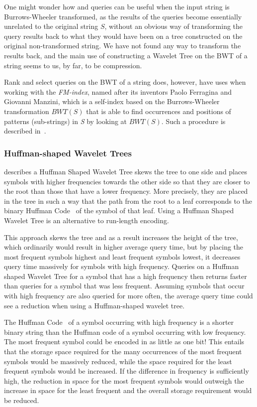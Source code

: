 One might wonder how  and  queries can be useful when the input string is Burrows-Wheeler transformed, as the results of the queries become essentially unrelated to the original string $S$, without an obvious way of transforming the query results back to what they would have been on a tree constructed on the original non-transformed string.
We have not found any way to transform the results back, and the main use of constructing a Wavelet Tree on the BWT of a string seems to us, by far, to be compression.

Rank and select queries on the BWT of a string does, however, have uses when working with the \textit{FM-index}, named after its inventors Paolo Ferragina and Giovanni Manzini, which is a self-index based on the Burrows-Wheeler transformation $BWT(S)$ that is able to find occurrences and positions of patterns (sub-strings) in \textit{S} by looking at $BWT(S)$. 
Such a procedure is described in~\citep[Section 2]{FMcountOnBWT}.

\subsubsection{Huffman-shaped Wavelet Trees}
\citep[Section~4]{FMcountOnBWT} describes a Huffman Shaped Wavelet Tree skews the tree to one side and places symbols with higher frequencies towards the other side so that they are closer to the root than those that have a lower frequency.
More precisely, they are placed in the tree in such a way that the path from the root to a leaf corresponds to the binary Huffman Code~\citep[Introduction]{HuffmanCoding} of the symbol of that leaf.
Using a Huffman Shaped Wavelet Tree is an alternative to run-length encoding.

This approach skews the tree and as a result increases the height of the tree, which ordinarily would result in higher average query time, but by placing the most frequent symbols highest and least frequent symbols lowest, it decreases query time massively for symbols with high frequency.
Queries on a Huffman shaped Wavelet Tree for a symbol that has a high frequency then returns faster than queries for a symbol that was less frequent.
Assuming symbols that occur with high frequency are also queried for more often, the average query time could see a reduction when using a Huffman-shaped wavelet tree.

The Huffman Code~\citep[Introduction]{HuffmanCoding} of a symbol occurring with high frequency is a shorter binary string than the Huffman code of a symbol occurring with low frequency.
The most frequent symbol could be encoded in as little as one bit!
This entails that the storage space required for the many occurrences of the most frequent symbols would be massively reduced, while the space required for the least frequent symbols would be increased.
If the difference in frequency is sufficiently high, the reduction in space for the most frequent symbols would outweigh the increase in space for the least frequent and the overall storage requirement would be reduced.

